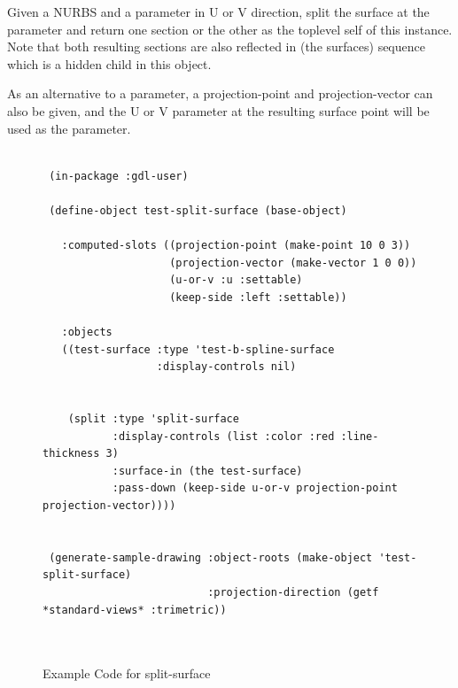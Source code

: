 \documentclass [11pt]{book}
\begin{document}
\begin{itemize}
\begin{description}
Given a NURBS and a parameter in U or V direction,
split the surface at the parameter and return one section or the other as the 
toplevel self of this instance. Note that both resulting sections are also 
reflected in (the surfaces) sequence which is a hidden child in this object.

As an alternative to a parameter, a projection-point and projection-vector 
can also be given, and the U or V parameter at the resulting surface point
will be used as the parameter.





\end{description}




\begin{figure}
\begin{lrbox}{\boxedverb}
\begin{minipage}{\linewidth}
{\small

\begin{verbatim}

 (in-package :gdl-user)

 (define-object test-split-surface (base-object)
  
   :computed-slots ((projection-point (make-point 10 0 3))
                    (projection-vector (make-vector 1 0 0))
                    (u-or-v :u :settable)
                    (keep-side :left :settable))
  
   :objects
   ((test-surface :type 'test-b-spline-surface
                  :display-controls nil)

   
    (split :type 'split-surface
           :display-controls (list :color :red :line-thickness 3)
           :surface-in (the test-surface)
           :pass-down (keep-side u-or-v projection-point projection-vector))))


 (generate-sample-drawing :object-roots (make-object 'test-split-surface)
                          :projection-direction (getf *standard-views* :trimetric))



\end{verbatim}}
\end{minipage}
\end{lrbox}
\fbox{\usebox{\boxedverb}}

\caption{Example Code for split-surface}

\label{fig:example-code-split-surface}

\end{figure}


\end{itemize}
\end{document}
